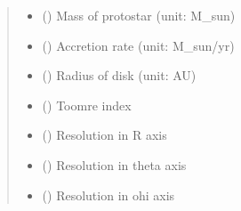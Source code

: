 \documentclass[a4paper,11pt,english]{sphinxmanual}
\begin{document}
\begin{fulllineitems}
\begin{fulllineitems}
\begin{quote}
\begin{description}
\begin{itemize}
\item {} 
\sphinxAtStartPar
{} () \textendash{} Mass of protostar (unit: M\_sun)

\item {} 
\sphinxAtStartPar
{} () \textendash{} Accretion rate    (unit: M\_sun/yr)

\item {} 
\sphinxAtStartPar
{} () \textendash{} Radius of disk    (unit: AU)

\item {} 
\sphinxAtStartPar
{} () \textendash{} Toomre index

\item {} 
\sphinxAtStartPar
{} () \textendash{} Resolution in R axis

\item {} 
\sphinxAtStartPar
{} () \textendash{} Resolution in theta axis

\item {} 
\sphinxAtStartPar
{} () \textendash{} Resolution in ohi axis

\end{itemize}

\end{description}\end{quote}

\end{fulllineitems}



\end{fulllineitems}
\end{document}
